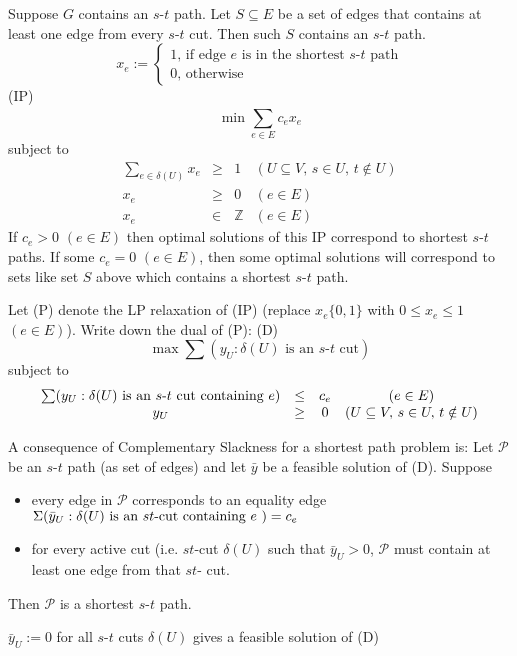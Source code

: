 Suppose $ G $ contains an $s$-$t$ path. Let $ S\subseteq E $ be a set of edges that contains
at least one edge from every $s$-$t$ cut. Then such $ S $ contains an $s$-$t$ path.
\[ x_e:=
\begin{cases}
    1,\,\text{if edge $e$ is in the shortest $s$-$t$ path}\\
    0,\,\text{otherwise}
\end{cases} \]
(IP) \[ \min \sum\limits_{e\in E}^{} c_ex_e \]
subject to
\[
\begin{array}{cccc}
    \sum\limits_{e\in\delta(U)} x_e & \ge & 1 & (U\subseteq V,\,s\in U,\,t\notin U)\\
    x_e  & \ge & 0 & (e\in E)\\
    x_e & \in & \mathbb{Z} & (e\in E)
\end{array}
\]
If $ c_e>0$ $(e\in E)$ then optimal solutions of this IP correspond to
shortest $s$-$t$ paths. If some $ c_e=0 $ $(e\in E)$, then some optimal solutions will
correspond to sets like set $ S $ above which contains a shortest $s$-$t$ path.

Let (P) denote the LP relaxation of (IP) (replace $ x_e \{0,1\} $ with
$ 0\le x_e\le 1$ $ (e\in E) $). Write down the dual of (P):
(D)
\[ \max \sum(y_U:\delta(U)\text{ is an $s$-$t$ cut})  \]
subject to
\[ 
\begin{array}{cccc}
    \sum(y_U:\delta(U)\text{ is an $s$-$t$ cut containing $ e $}) & \le & c_e & (e\in E)\\
    y_U & \ge & 0 & (U\subseteq V,\,s\in U,\,t\notin U)
\end{array} \]

A consequence of Complementary Slackness for a shortest path problem is:
Let $ \mathcal{P} $ be an $s$-$t$ path (as set of edges) and let
$ \bar{y} $ be a feasible solution of (D). Suppose
\begin{itemize}
    \item every edge in $ \mathcal{P} $ corresponds to an equality edge 
    $ \Sigma(\bar{y}_U:\delta(U)\text{ is an $st$-cut containing $ e $ })=c_e $
    \item for every active cut (i.e. $st$-cut $ \delta(U) $ such that
    $ \bar{y}_U>0 $, $ \mathcal{P} $ must contain at least one edge from
    that $ st $- cut.
\end{itemize}
Then $ \mathcal{P} $ is a shortest $s$-$t$ path. 

\begin{remark}
    $ \bar{y}_U:=0 $ for all $s$-$t$ cuts $ \delta(U) $ gives a feasible
    solution of (D)
\end{remark}

